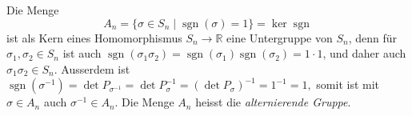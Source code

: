 Die Menge
\[
A_n
=
\{ \sigma\in S_n \mid \operatorname{sgn}(\sigma) = 1 \}
=
\ker
\operatorname{sgn}
\]
ist als Kern eines Homomorphismus $S_n\to\mathbb{R}$
eine Untergruppe von $S_n$, denn für $\sigma_1,\sigma_2\in S_n$ ist auch
\(
\operatorname{sgn}(\sigma_1\sigma_2)
=
\operatorname{sgn}(\sigma_1)
\operatorname{sgn}(\sigma_2)
=
1\cdot 1
\),
und daher auch $\sigma_1\sigma_2\in S_n$.
Ausserdem ist 
\(
\operatorname{sgn}(\sigma^{-1})=\det P_{\sigma^{-1}}
=
\det P_\sigma^{-1}
=
(\det P_\sigma)^{-1}
=
1^{-1}=1,
\)
somit ist mit $\sigma\in A_n$ auch $\sigma^{-1}\in A_n$.
Die Menge $A_n$ heisst die {\em alternierende Gruppe}.

